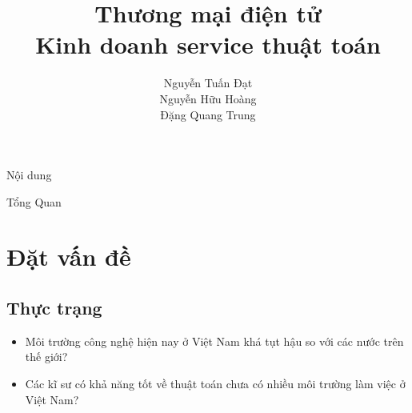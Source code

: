 \documentclass{beamer}
\title[]{{\huge \bf Thương mại điện tử}\\
 \large Kinh doanh service thuật toán }
\author[]{
Nguyễn Tuấn Đạt\\%
Nguyễn Hữu Hoàng \\
Đặng Quang Trung\\
}
\institute[]{
}
\newcommand{\bi}{\begin{itemize}}
\newcommand{\ei}{\end{itemize}}
\begin{document}
\begin{frame}
\titlepage
\end{frame}

\begin{frame}{Nội dung}
\tableofcontents
\end{frame}

\begin{frame}{Tổng Quan}
\section{ Đặt vấn đề}
\subsection{Thực trạng}
\bi 
\item Môi trường công nghệ hiện nay ở Việt Nam khá tụt hậu so với các nước trên thế giới?
\item Các kĩ sư có khả năng tốt về thuật toán chưa có nhiều môi trường làm việc ở Việt Nam?
\ei 
\end{frame}
\end{document}
